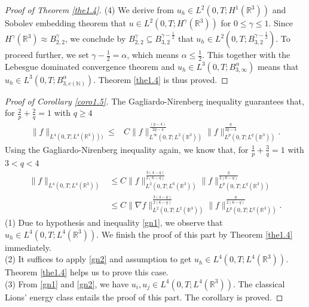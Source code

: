 \documentclass[11pt]{article}
\theoremstyle{plain}\newtheorem{definition}{Definition}[section]
\theoremstyle{definition}\newtheorem{theorem}{Theorem}[section]
\theoremstyle{plain}\newtheorem{lemma}[theorem]{Lemma}
\theoremstyle{plain}\newtheorem{coro}[theorem]{Corollary}
\theoremstyle{plain}\newtheorem{prop}[theorem]{Proposition}
\theoremstyle{remark}\newtheorem{remark}{Remark}[section]
\newcommand{\be}{\begin{equation}}
\newcommand{\ee}{\end{equation}}
\newcommand{\f}{\frac}
\numberwithin{equation}{section}
\begin{document}
\begin{proof}[Proof of Theorem \ref{the1.4}]
(4)
We derive from $u_{h}\in L^{2}(0,T;H^{1}(\mathbb{R}^3))$ and Sobolev embedding theorem that $u\in L^{2}(0,T;H^{\gamma}(\mathbb{R}^3))$ for $0\leq\gamma\leq1$. Since $H^{\gamma}(\mathbb{R}^3)\approx B^{\gamma}_{2,2}$, we conclude  by  $B^{\gamma}_{2,2}\subseteq B^{\gamma-\f12}_{3,2}$ that $u_{h}\in L^{2}(0,T; B^{\gamma-\f12}_{3,2})$. To proceed further, we set $\gamma-\f12=\alpha$, which means $\alpha\leq\f12.$ This together with the Lebesgue dominated convergence theorem and $ u_{h}\in L^{3}(0,T;B_{3,\infty}^{\alpha})$
means that $ u_{h}\in L^{3}(0,T;B_{3,c(\mathbb{N})}^{\alpha})$.
Theorem \ref{the1.4} is thus proved.
\end{proof}


\begin{proof}[Proof of Corollary \ref{coro1.5}]
The  Gagliardo-Nirenberg   inequality  guarantees that,  for  $\frac{2}{p}+\frac{2}{q}=1$ with $q\geq 4$
\be\label{gn1}
\begin{aligned}
\|f\|_{L^{4}(0,T;L^{4}(\mathbb{R}^{3}) ))}  \leq& C\|f\|_{L^{\infty}\left(0,T;L^{2}(\mathbb{R}^{3})\right)}^{\frac{(q-4)}{2 q-4}}\|f\|_{L^{p}(0,T;L^q(\mathbb{R}^{3}))}^{\frac{q}{2q-4}}.
\end{aligned}
\ee
Using the Gagliardo-Nirenberg   inequality again, we know that,  for $\frac{1}{p}+\frac{3}{q}=1$ with $3<q<4$
\be\label{gn2}
\begin{aligned}
\|f\|_{L^{4}(0,T;L^{4}(\mathbb{R}^{3}))}
&\leq C\|f\|_{L^2(0,T;L^6(\mathbb{R}^{3}))}^{\frac{3(4-q)}{2(6-q)}}
\|f\|_{L^p(0,T;L^q(\mathbb{R}^{3}))}^{\frac{q}{2(6-q)}}
\\
&\leq C\|\nabla f\|_{L^2(0,T;L^2(\mathbb{R}^{3}))}^{\frac{3(4-q)}{2(6-q)}}
\|f\|_{L^p(0,T;L^q(\mathbb{R}^{3}))}^{\frac{q}{2(6-q)}}.
\end{aligned}
\ee
(1)   Due to hypothesis and inequality \eqref{gn1}, we observe that $ u_{h}\in L^{4}(0,T;L^{4}(\mathbb{R}^{3}))$. We  finish the proof of this part by Theorem \ref{the1.4} immediately.\\
(2) It suffices to apply  \eqref{gn2} and assumption to get $ u_{h}\in L^{4}(0,T;L^{4}(\mathbb{R}^{3}))$. Theorem \ref{the1.4} helps us to prove this case.\\
(3) From \eqref{gn1} and \eqref{gn2}, we have $u_i, u_j\in L^{4}(0,T;L^{4}(\mathbb{R}^{3})).$ The classical Lions' energy class entails the proof of this part. The corollary is proved.
\end{proof}
\end{document}
